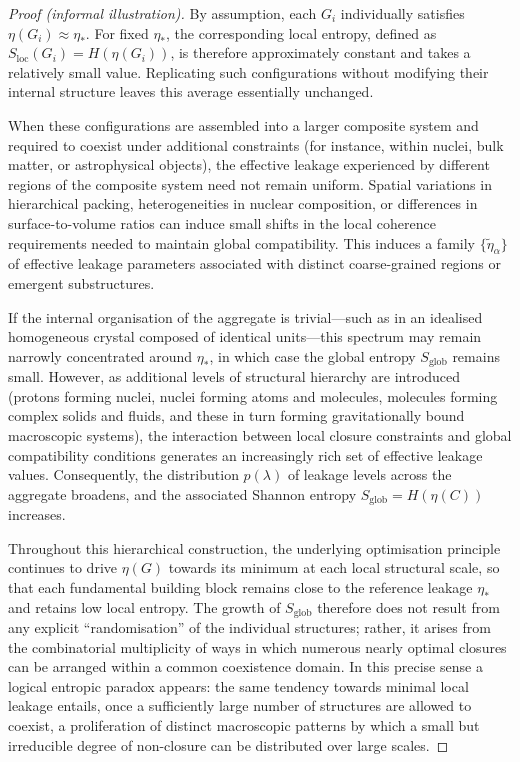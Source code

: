 \documentclass[11pt,a4paper]{article}
\theoremstyle{definition}
\begin{document}
\begin{proof}[Proof (informal illustration)]
By assumption, each \(G_i\) individually satisfies \(\eta(G_i) \approx \eta_{\ast}\). For fixed \(\eta_{\ast}\), the corresponding local entropy, defined as \(S_{\mathrm{loc}}(G_i) = H(\eta(G_i))\), is therefore approximately constant and takes a relatively small value. Replicating such configurations without modifying their internal structure leaves this average essentially unchanged.

When these configurations are assembled into a larger composite system and required to coexist under additional constraints (for instance, within nuclei, bulk matter, or astrophysical objects), the effective leakage experienced by different regions of the composite system need not remain uniform. Spatial variations in hierarchical packing, heterogeneities in nuclear composition, or differences in surface-to-volume ratios can induce small shifts in the local coherence requirements needed to maintain global compatibility. This induces a family \(\{\tilde{\eta}_\alpha\}\) of effective leakage parameters associated with distinct coarse-grained regions or emergent substructures.

If the internal organisation of the aggregate is trivial—such as in an idealised homogeneous crystal composed of identical units—this spectrum may remain narrowly concentrated around \(\eta_{\ast}\), in which case the global entropy \(S_{\mathrm{glob}}\) remains small. However, as additional levels of structural hierarchy are introduced (protons forming nuclei, nuclei forming atoms and molecules, molecules forming complex solids and fluids, and these in turn forming gravitationally bound macroscopic systems), the interaction between local closure constraints and global compatibility conditions generates an increasingly rich set of effective leakage values. Consequently, the distribution \(p(\lambda)\) of leakage levels across the aggregate broadens, and the associated Shannon entropy \(S_{\mathrm{glob}} = H(\eta(C))\) increases.

Throughout this hierarchical construction, the underlying optimisation principle continues to drive \(\eta(G)\) towards its minimum at each local structural scale, so that each fundamental building block remains close to the reference leakage \(\eta_{\ast}\) and retains low local entropy. The growth of \(S_{\mathrm{glob}}\) therefore does not result from any explicit ``randomisation'' of the individual structures; rather, it arises from the combinatorial multiplicity of ways in which numerous nearly optimal closures can be arranged within a common coexistence domain. In this precise sense a logical entropic paradox appears: the same tendency towards minimal local leakage entails, once a sufficiently large number of structures are allowed to coexist, a proliferation of distinct macroscopic patterns by which a small but irreducible degree of non-closure can be distributed over large scales.
\end{proof}
\end{document}
